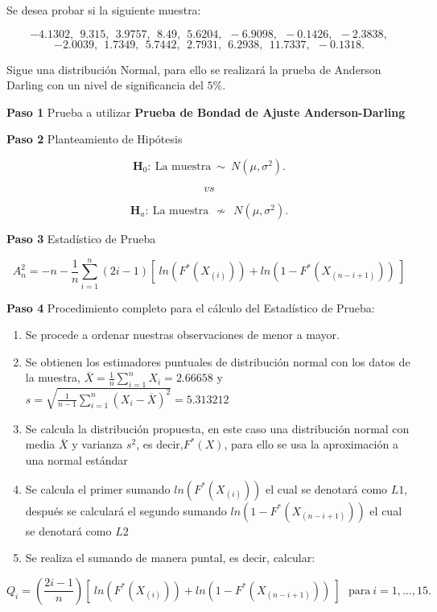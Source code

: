 \documentclass[
  a4paper,
  oneside,
  openany]{book}
\begin{document}
Se desea probar si la siguiente muestra:

\[-4.1302,\ \ 9.315,\ \ 3.9757,\ \ 8.49,\ \ 5.6204,\ \ -6.9098,\ \ -0.1426,\ \ -2.3838,\]
\[-2.0039,\ \ 1.7349,\ \ 5.7442,\ \ 2.7931,\ \ 6.2938,\ \ 11.7337,\ \ -0.1318.\]

Sigue una distribución Normal, para ello se realizará la prueba de Anderson Darling con un nivel de significancia del \(5\%\).

\textbf{Paso 1} Prueba a utilizar \textbf{Prueba de Bondad de Ajuste Anderson-Darling}

\textbf{Paso 2} Planteamiento de Hipótesis

\[\textbf{H}_0: \ \mbox{La muestra} \ \sim \  N(\mu,\sigma^2).\]

\[vs\]

\[\textbf{H}_a: \ \mbox{La muestra} \ \ \nsim \ \  N(\mu,\sigma^2).\]

\textbf{Paso 3} Estadístico de Prueba

\[A_n^2=-n-\frac{1}{n}\sum_{i=1}^{n}\left(2i-1\right)[ \ ln(F^*(X_{(i)})) +ln(1-F^*(X_{(n-i+1)})) \ ]\]

\textbf{Paso 4} Procedimiento completo para el cálculo del Estadístico de Prueba:

\begin{enumerate}
\def\labelenumi{\arabic{enumi})}
\item
  Se procede a ordenar nuestras observaciones de menor a mayor.
\item
  Se obtienen los estimadores puntuales de distribución normal con los datos de la muestra,
  \(\overline{X}=\frac{1}{n}\sum_{i=1}^{n}X_{i}= 2.66658\) y \(s=\sqrt{\frac{1}{n-1}\sum_{i=1}^{n}(X_{i}-\overline{X})^2}=5.313212\)
\item
  Se calcula la distribución propuesta, en este caso una distribución normal con media \(\overline{X}\) y varianza \(s^2\), es decir,\(F^*(X)\), para ello se usa la aproximación a una normal estándar
\item
  Se calcula el primer sumando \(ln(F^*(X_{(i)}))\) el cual se denotará como \(L1\), después se calculará el segundo sumando \(ln(1-F^*(X_{(n-i+1)}))\) el cual se denotará como \(L2\)
\item
  Se realiza el sumando de manera puntal, es decir, calcular:
\end{enumerate}

\[Q_{i}=\left(\frac{2i-1}{n}\right)[ \ ln(F^*(X_{(i)})) +ln(1-F^*(X_{(n-i+1)})) \ ] \ \ \ \mbox{para} \  i=1,\ldots,15.\]
\end{document}
